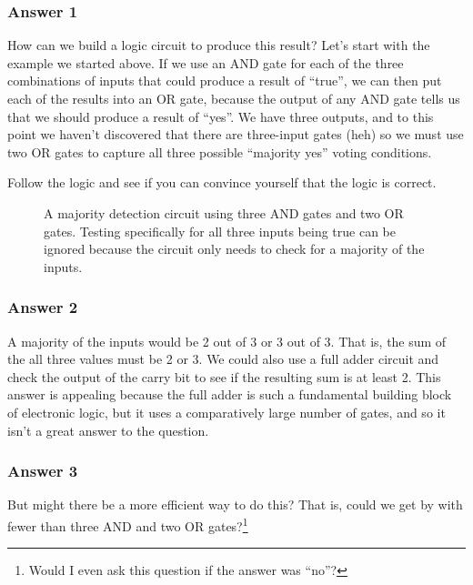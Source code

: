 \vfill

\subsubsection*{Answer 1}

How can we build a logic circuit to produce this result? Let's start with the example we started above. If we use an AND gate for each of the three combinations of inputs that could produce a result of ``true'', we can then put each of the results into an OR gate, because the output of any AND gate tells us that we should produce a result of ``yes''. We have three outputs, and to this point we haven't discovered that there are three-input gates (heh) so we must use two OR gates to capture all three possible ``majority yes'' voting conditions.

Follow the logic and see if you can convince yourself that the logic is correct.


\begin{figure}[hb!]
\begin{center}


\caption{A majority detection circuit using three AND gates and two OR gates. Testing specifically for all three inputs being true can be ignored because the circuit only needs to check for a majority of the inputs.}

\end{center}
\end{figure}

\clearpage

\subsubsection*{Answer 2}

A majority of the inputs would be 2 out of 3 or 3 out of 3. That is, the sum of the all three values must be 2 or 3. We could also use a full adder circuit and check the output of the carry bit to see if the resulting sum is at least 2. This answer is appealing because the full adder is such a fundamental building block of electronic logic, but it uses a comparatively large number of gates, and so it isn't a great answer to the question.



\subsubsection*{Answer 3}
But might there be a more efficient way to do this? That is, could we get by with fewer than three AND and two OR gates?\footnote{Would I even ask this question if the answer was ``no''?}

